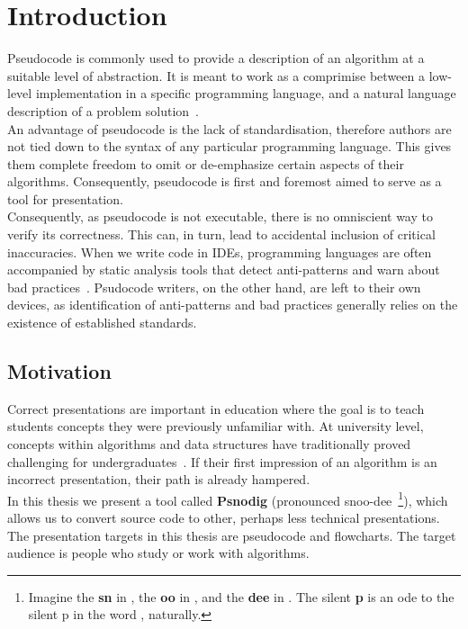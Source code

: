 \chapter{Introduction}

Pseudocode is commonly used to provide a description of an algorithm at a suitable level of abstraction. It is meant to work as a comprimise between a low-level implementation in a specific programming language, and a natural language description of a problem solution~\cite{whatIsPseudocode}. \\

An advantage of pseudocode is the lack of standardisation, therefore authors are not tied down to the syntax of any particular programming language. This gives them complete freedom to omit or de-emphasize certain aspects of their algorithms. Consequently, pseudocode is first and foremost aimed to serve as a tool for presentation. \\

Consequently, as pseudocode is not executable, there is no omniscient way to verify its correctness. This can, in turn, lead to accidental inclusion of critical inaccuracies. %
When we write code in IDEs, programming languages are often accompanied by static analysis tools that detect anti-patterns and warn about bad practices~\cite{manyLinters, whatIsALinter}. Psudocode writers, on the other hand, are left to their own devices, as identification of anti-patterns and bad practices generally relies on the existence of established standards. \\


\section{Motivation}

Correct presentations are important in education where the goal is to teach students concepts they were previously unfamiliar with. At university level, concepts within algorithms and data structures have traditionally proved challenging for undergraduates~\cite{algorithmsAreHard1, algorithmsAreHard2}. If their first impression of an algorithm is an incorrect presentation, their path is already hampered. \\

In this thesis we present a tool called \textbf{Psnodig} (pronounced snoo-dee~\footnote{Imagine the \textbf{sn} in , the \textbf{oo} in , and the \textbf{dee} in . The silent \textbf{p} is an ode to the silent p in the word , naturally.}), which allows us to convert source code to other, perhaps less technical presentations. The presentation targets in this thesis are pseudocode and flowcharts. The target audience is people who study or work with algorithms. \\

